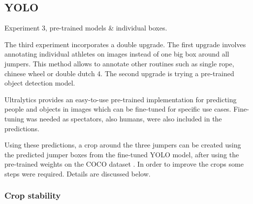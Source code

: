 \subsection{YOLO}

Experiment 3, pre-trained models \& individual boxes.

The third experiment incorporates a double upgrade. The first upgrade involves annotating individual athletes on images instead of one big box around all jumpers. This method allows to annotate other routines such as single rope, chinese wheel or double dutch 4. The second upgrade is trying a pre-trained object detection model.

Ultralytics \autocite{Khanam2024} provides an easy-to-use pre-trained implementation for predicting people and objects in images which can be fine-tuned for specific use cases. Fine-tuning was needed as spectators, also humans, were also included in the predictions.

Using these predictions, a crop around the three jumpers can be created using the predicted jumper boxes from the fine-tuned YOLO model, after using the pre-trained weights on the COCO dataset \autocite{Lin2014}. In order to improve the crops some steps were required. Details are discussed below.

\subsubsection{Crop stability}


